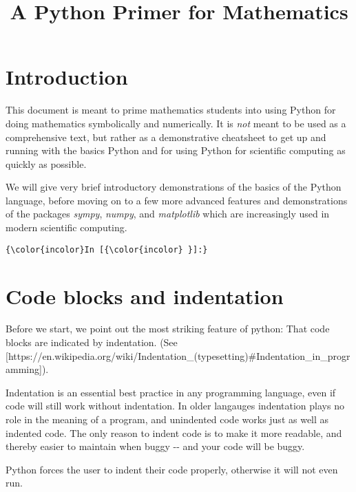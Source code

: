 \documentclass{report}
\title{A Python Primer for Mathematics}
\begin{document}
    
    
    
    \maketitle
    
    
    \tableofcontents


    
\chapter{Introduction}\label{introduction}

This document is meant to prime mathematics students into using Python
for doing mathematics symbolically and numerically. It is \emph{not}
meant to be used as a comprehensive text, but rather as a demonstrative
cheatsheet to get up and running with the basics Python and for using
Python for scientific computing as quickly as possible.

We will give very brief introductory demonstrations of the basics of the
Python language, before moving on to a few more advanced features and
demonstrations of the packages \emph{sympy}, \emph{numpy}, and
\emph{matplotlib} which are increasingly used in modern scientific
computing.

    \begin{Verbatim}[commandchars=\\\{\}]
{\color{incolor}In [{\color{incolor} }]:} 
\end{Verbatim}

\chapter{Code blocks and indentation}\label{code-blocks-and-indentation}

Before we start, we point out the most striking feature of python: That
code blocks are indicated by indentation. (See
{[}https://en.wikipedia.org/wiki/Indentation\_(typesetting)\#Indentation\_in\_programming{]}).

Indentation is an essential best practice in any programming language,
even if code will still work without indentation. In older langauges
indentation plays no role in the meaning of a program, and unindented
code works just as well as indented code. The only reason to indent code
is to make it more readable, and thereby easier to maintain when buggy
-\/- and your code will be buggy.

Python forces the user to indent their code properly, otherwise it will
not even run.
\end{document}
